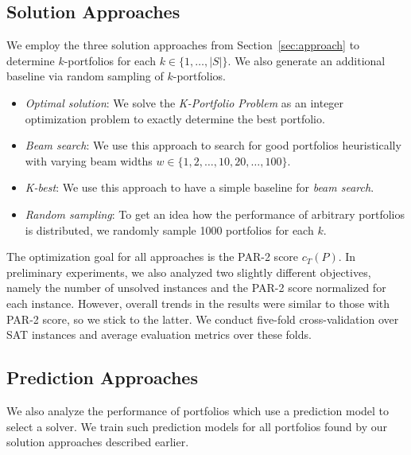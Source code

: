 \documentclass[conference]{IEEEtran}
\begin{document}
\subsection{Solution Approaches}

We employ the three solution approaches from Section~\ref{sec:approach} to determine $k$-portfolios for each $k \in \{1, \dots, |S|\}$. 
We also generate an additional baseline via random sampling of $k$-portfolios.

\begin{itemize}
	\item \emph{Optimal solution}:
	We solve the \emph{K-Portfolio Problem} as an integer optimization problem to exactly determine the best portfolio.
	\item \emph{Beam search}: 
	We use this approach to search for good portfolios heuristically with varying beam widths $w \in \{1, 2, \dots, 10, 20, \dots, 100\}$.
	\item \emph{K-best}:
	We use this approach to have a simple baseline for \emph{beam search}.
	\item \emph{Random sampling}:
	To get an idea how the performance of arbitrary portfolios is distributed, we randomly sample 1000 portfolios for each $k$.
\end{itemize}

The optimization goal for all approaches is the PAR-2 score $c_T(P)$.
In preliminary experiments, we also analyzed two slightly different objectives, namely the number of unsolved instances and the PAR-2 score normalized for each instance.
However, overall trends in the results were similar to those with PAR-2 score, so we stick to the latter.
We conduct five-fold cross-validation over SAT instances and average evaluation metrics over these folds. 


\subsection{Prediction Approaches}

We also analyze the performance of portfolios which use a prediction model to select a solver. 
We train such prediction models for all portfolios found by our solution approaches described earlier. %
\end{document}
